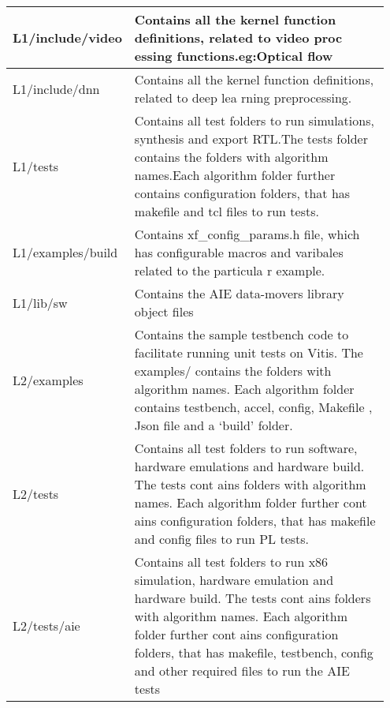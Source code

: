 \begin{table}[H]
{\begin{tabular}{|>{\hspace{0pt}}m{0.20\linewidth}|>{\hspace{0pt}}m{0.75\linewidth}|}
  \hline
  L1/include/video    & Contains all the kernel function definitions, related to video proc essing functions.eg:Optical flow                                                                                                                                                                                         \\ 
  \hline
  L1/include/dnn      & Contains all the kernel function definitions, related to deep lea rning preprocessing.                                                                                                                                                                                                       \\ 
  \hline
  L1/tests            & Contains all test folders to run simulations, synthesis and export RTL.The tests folder contains the folders with algorithm names.Each algorithm folder further contains configuration folders, that has makefile and tcl files to run tests.                                                \\ 
  \hline
  L1/examples/build   & Contains xf\_config\_params.h file, which has configurable macros and varibales related to the particula r example.                                                                                                                                                                          \\ 
  \hline
  L1/lib/sw           & Contains the AIE data-movers library object files                                                                                                                                                                                                                                            \\ 
  \hline
  L2/examples         & Contains the sample testbench code to facilitate running unit tests on Vitis. The examples/ contains the folders with algorithm names. Each algorithm folder contains testbench, accel, config, Makefile , Json file and a ‘build’ folder.                                                   \\ 
  \hline
  L2/tests            & Contains all test folders to run software, hardware emulations and hardware build. The tests cont ains folders with algorithm names. Each algorithm folder further cont ains configuration folders, that has makefile and config files to run PL tests.                                      \\ 
  \hline
  L2/tests/aie        & Contains all test folders to run x86 simulation, hardware emulation and hardware build. The tests cont ains folders with algorithm names. Each algorithm folder further cont ains configuration folders, that has makefile, testbench, config and other required files to run the AIE tests  \\ 

\end{tabular}}
\end{table}
